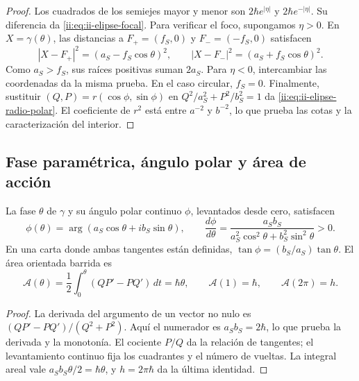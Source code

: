 \begin{proof}
Los cuadrados de los semiejes mayor y menor son
\(2\hbar e^{|\eta|}\) y \(2\hbar e^{-|\eta|}\). Su diferencia
da \eqref{ii:eq:ii-elipse-focal}. Para verificar el foco, supongamos
\(\eta>0\). En \(X=\gamma(\theta)\), las distancias a
\(F_+=(f_S,0)\) y \(F_-=(-f_S,0)\) satisfacen
\[
 |X-F_+|^2=(a_S-f_S\cos\theta)^2,\qquad
 |X-F_-|^2=(a_S+f_S\cos\theta)^2.
\]
Como \(a_S>f_S\), sus raíces positivas suman \(2a_S\).
Para \(\eta<0\), intercambiar las coordenadas da la misma prueba.
En el caso circular, \(f_S=0\). Finalmente, sustituir
\((Q,P)=r(\cos\phi,\sin\phi)\) en
\(Q^2/a_S^2+P^2/b_S^2=1\) da
\eqref{ii:eq:ii-elipse-radio-polar}. El coeficiente de \(r^2\) está
entre \(a^{-2}\) y \(b^{-2}\), lo que prueba las cotas y la
caracterización del interior.
\end{proof}

\subsection{Fase paramétrica, ángulo polar y área de acción}
\label{ii:sec:ii-elipse-fase-area}

\begin{proposition}
\label{ii:prop:ii-elipse-area}
La fase \(\theta\) de \(\gamma\) y su ángulo polar continuo
\(\phi\), levantados desde cero, satisfacen
\begin{equation}
 \phi(\theta)=\arg(a_S\cos\theta+i b_S\sin\theta),\qquad
 \frac{d\phi}{d\theta}
 =\frac{a_Sb_S}{a_S^2\cos^2\theta+b_S^2\sin^2\theta}>0.
 \label{ii:eq:ii-elipse-fases}
\end{equation}
En una carta donde ambas tangentes están definidas,
\(\tan\phi=(b_S/a_S)\tan\theta\). El área orientada barrida es
\begin{equation}
 \mathcal A(\theta)=\frac12\int_0^\theta(QP'-PQ')\,dt
 =\hbar\theta,\qquad
 \mathcal A(1)=\hbar,\qquad \mathcal A(2\pi)=h.
 \label{ii:eq:ii-elipse-area-fase}
\end{equation}
\end{proposition}

\begin{proof}
La derivada del argumento de un vector no nulo es
\((QP'-PQ')/(Q^2+P^2)\). Aquí el numerador es
\(a_Sb_S=2\hbar\), lo que prueba la derivada y la monotonía.
El cociente \(P/Q\) da la relación de tangentes; el levantamiento
continuo fija los cuadrantes y el número de vueltas. La integral areal
vale \(a_Sb_S\theta/2=\hbar\theta\), y
\(h=2\pi\hbar\) da la última identidad.
\end{proof}

